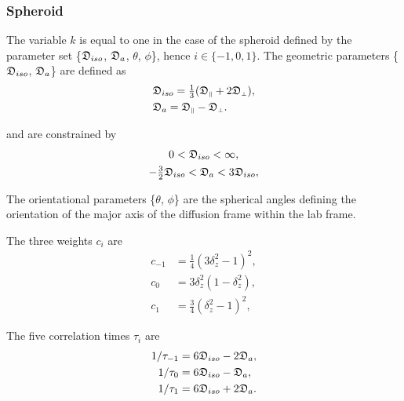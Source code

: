\subsubsection{Spheroid}
The variable $k$ is equal to one in the case of the spheroid defined by the parameter set \{$\mathfrak{D}_{iso}$, $\mathfrak{D}_a$, $\theta$, $\phi$\}, hence $i \in \{-1, 0, 1\}$.  The geometric parameters \{$\mathfrak{D}_{iso}$, $\mathfrak{D}_a$\} are defined as
\begin{subequations}
\begin{align}
 & \mathfrak{D}_{iso} = \tfrac{1}{3} (\mathfrak{D}_{\scriptscriptstyle \parallel} + 2\mathfrak{D}_{\scriptscriptstyle \perp}),   \label{eq: Diso spheroid def} \\
 & \mathfrak{D}_a = \mathfrak{D}_{\scriptscriptstyle \parallel} - \mathfrak{D}_{\scriptscriptstyle \perp}.                       \label{eq: Da spheroid def}
\end{align}
\end{subequations}

\noindent and are constrained by
\begin{subequations}
\begin{gather}
 0 < \mathfrak{D}_{iso} < \infty, \\
 -\tfrac{3}{2} \mathfrak{D}_{iso} < \mathfrak{D}_a < 3\mathfrak{D}_{iso},
\end{gather}
\end{subequations}

\noindent The orientational parameters \{$\theta$, $\phi$\} are the spherical angles defining the orientation of the major axis of the diffusion frame within the lab frame.


The three weights $c_i$ are
\begin{subequations}
\begin{align}
 c_{-1} &= \tfrac{1}{4}(3\delta_z^2 - 1)^2, \label{eq: spheroid c-1} \\
 c_{0}  &= 3\delta_z^2(1 - \delta_z^2),     \label{eq: spheroid c0} \\
 c_{1}  &= \tfrac{3}{4}(\delta_z^2 - 1)^2,  \label{eq: spheroid c1}
\end{align}
\end{subequations}

The five correlation times $\tau_i$ are
\begin{subequations}
\begin{align}
 1/\tau_{-1} &= 6\mathfrak{D}_{iso} - 2\mathfrak{D}_a,    \label{eq: spheroid tau-1} \\
 1/\tau_{0}  &= 6\mathfrak{D}_{iso} - \mathfrak{D}_a,     \label{eq: spheroid tau0} \\
 1/\tau_{1}  &= 6\mathfrak{D}_{iso} + 2\mathfrak{D}_a.    \label{eq: spheroid tau1}
\end{align}
\end{subequations}


